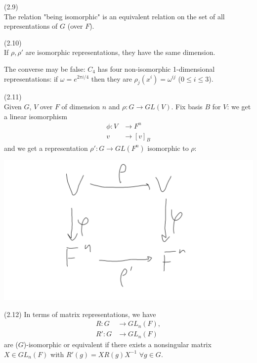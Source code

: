 \documentclass[a4paper]{article}
\begin{document}
\begin{lemma} (2.9)\\
The relation "being isomorphic" is an equivalent relation on the set of all representations of $G$ (over $F$).
\end{lemma}

\begin{rem} (2.10)\\
If $\rho,\rho'$ are isomorphic representations, they have the same dimension.

The converse may be false: $C_4$ has four non-isomorphic 1-dimensional representations: if $\omega = e^{2\pi i/4}$ then they are $\rho_j(x^i) = \omega^{ij}$ ($0 \leq i \leq 3$).
\end{rem}

\begin{rem} (2.11)\\
Given $G$, $V$ over $F$ of dimension $n$ and $\rho:G \to GL(V)$. Fix basis $B$ for $V$: we get a linear isomorphism 
\begin{equation*}
\begin{aligned}
\phi:V &\to F^n\\
v &\to [v]_B
\end{aligned}
\end{equation*}
and we get a representation $\rho': G \to GL(F^n)$ isomorphic to $\rho$:

\includegraphics[scale=0.5]{image/Rep_02.png}
\end{rem}

(2.12) In terms of matrix representations, we have
\begin{equation*}
\begin{aligned}
R: G &\to GL_n(F),\\
R':G &\to GL_n(F)
\end{aligned}
\end{equation*}
are ($G$)-isomorphic or equivalent if there exists a nonsingular matrix $X \in GL_n(F)$ with $R'(g) = XR(g)X^{-1}$ $\forall g \in G$.
\end{document}

